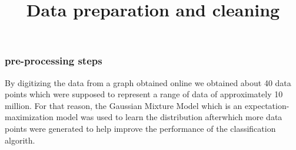 \documentclass{beamer}
\title{Data preparation and cleaning}
\begin{document}
\begin{frame}
\titlepage
\end{frame}

\begin{frame}
\frametitle{pre-processing steps}

By digitizing the data from a graph obtained  online we obtained about 40 data points which were supposed to represent a range of data of approximately 10 million. For that reason, the Gaussian Mixture Model which is an expectation-maximization model was used to learn the distribution afterwhich more data points were generated to help improve the performance of the classification algorith.



\end{frame}
\end{document}
